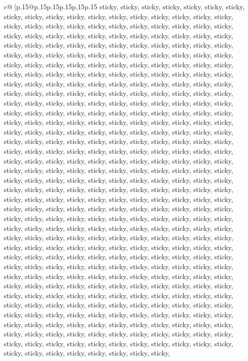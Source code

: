 \documentclass{article}
\begin{document}
{\begin{supertabular}{c@{$\;$}|p{.15\linewidth}@{}p{.15\linewidth}p{.15\linewidth}p{.15\linewidth}p{.15\linewidth}p{.15\linewidth}}
{{{sticky, sticky, sticky, sticky, sticky, sticky, sticky, sticky, sticky, sticky, sticky, sticky, sticky, sticky, sticky, sticky, sticky, sticky, sticky, sticky, sticky, sticky, sticky, sticky, sticky, sticky, sticky, sticky, sticky, sticky, sticky, sticky, sticky, sticky, sticky, sticky, sticky, sticky, sticky, sticky, sticky, sticky, sticky, sticky, sticky, sticky, sticky, sticky, sticky, sticky, sticky, sticky, sticky, sticky, sticky, sticky, sticky, sticky, sticky, sticky, sticky, sticky, sticky, sticky, sticky, sticky, sticky, sticky, sticky, sticky, sticky, sticky, sticky, sticky, sticky, sticky, sticky, sticky, sticky, sticky, sticky, sticky, sticky, sticky, sticky, sticky, sticky, sticky, sticky, sticky, sticky, sticky, sticky, sticky, sticky, sticky, sticky, sticky, sticky, sticky, sticky, sticky, sticky, sticky, sticky, sticky, sticky, sticky, sticky, sticky, sticky, sticky, sticky, sticky, sticky, sticky, sticky, sticky, sticky, sticky, sticky, sticky, sticky, sticky, sticky, sticky, sticky, sticky, sticky, sticky, sticky, sticky, sticky, sticky, sticky, sticky, sticky, sticky, sticky, sticky, sticky, sticky, sticky, sticky, sticky, sticky, sticky, sticky, sticky, sticky, sticky, sticky, sticky, sticky, sticky, sticky, sticky, sticky, sticky, sticky, sticky, sticky, sticky, sticky, sticky, sticky, sticky, sticky, sticky, sticky, sticky, sticky, sticky, sticky, sticky, sticky, sticky, sticky, sticky, sticky, sticky, sticky, sticky, sticky, sticky, sticky, sticky, sticky, sticky, sticky, sticky, sticky, sticky, sticky, sticky, sticky, sticky, sticky, sticky, sticky, sticky, sticky, sticky, sticky, sticky, sticky, sticky, sticky, sticky, sticky, sticky, sticky, sticky, sticky, sticky, sticky, sticky, sticky, sticky, sticky, sticky, sticky, sticky, sticky, sticky, sticky, sticky, sticky, sticky, sticky, sticky, sticky, sticky, sticky, sticky, sticky, sticky, sticky, sticky, sticky, sticky, sticky, sticky, sticky, sticky, sticky, sticky, sticky, sticky, sticky, sticky, sticky, sticky, sticky, sticky, sticky, sticky, sticky, sticky, sticky, sticky, sticky, sticky, sticky, sticky, sticky, sticky, sticky, sticky, sticky, sticky, sticky, sticky, sticky, sticky, sticky, sticky, sticky, sticky, sticky, sticky, sticky, sticky, sticky, sticky, sticky, sticky, sticky, sticky, sticky, sticky, sticky, sticky, sticky, sticky, sticky, sticky, sticky, sticky, sticky, sticky, sticky, sticky, sticky, sticky, sticky, sticky, sticky, sticky, sticky, sticky, sticky, sticky, sticky, sticky, sticky, sticky, sticky, sticky, sticky, sticky, sticky, sticky, sticky, sticky, sticky, sticky, sticky, sticky, sticky, sticky, sticky, sticky, sticky, sticky, sticky, sticky, sticky, sticky, sticky, sticky, sticky, sticky, sticky, sticky, sticky, sticky, sticky, sticky, sticky, sticky, sticky, sticky, sticky, sticky, sticky, sticky, sticky, sticky, sticky, sticky, sticky, sticky, sticky, sticky, sticky, sticky, sticky, sticky, sticky, sticky, sticky, sticky, sticky, sticky, sticky, sticky, sticky, sticky, sticky, sticky, sticky, sticky, sticky, sticky, sticky, sticky, sticky, sticky, sticky, sticky, sticky, sticky, sticky, sticky, sticky, sticky, sticky, sticky, sticky, }}}
\end{supertabular}}
\end{document}
